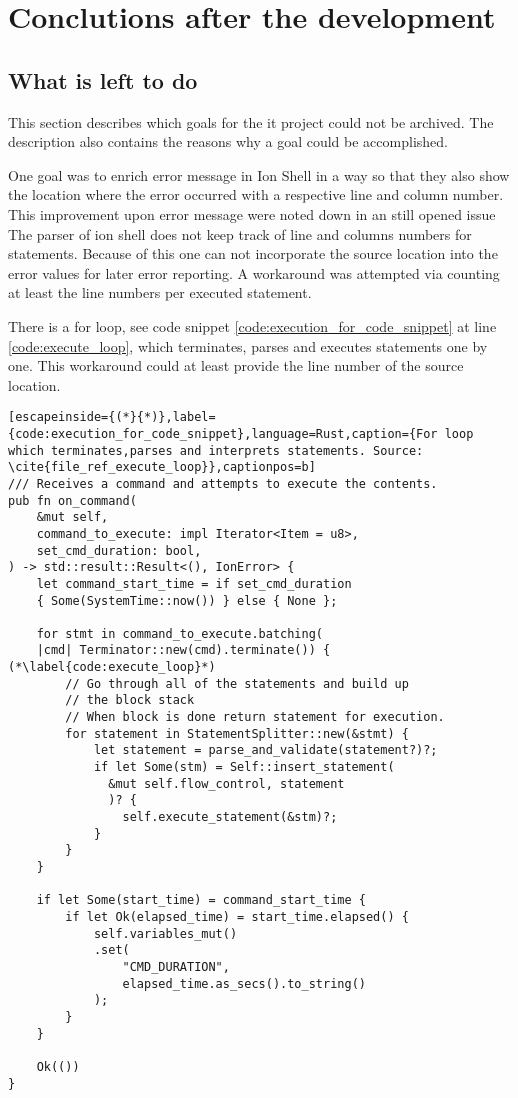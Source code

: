 \chapter{Conclutions after the development}

\section{What is left to do}

This section describes which goals for the it project could not be archived.
The description also contains the reasons why a goal could be accomplished.

One goal was to enrich error message in Ion Shell in a way
so that they also show the location where the error occurred with a respective line and column number.
This improvement upon error message were noted down in an still opened issue \cite{issue_enrich_error_message_information}
The parser of ion shell does not keep track of line and columns numbers for statements.
Because of this one can not incorporate the source location into the error values for later error reporting.
A workaround was attempted via counting at least the line numbers per executed statement.

There is a for loop, see code snippet \ref{code:execution_for_code_snippet} at line \ref{code:execute_loop},
which terminates, parses and executes statements one by one.
This workaround could at least provide the line number of the source location.



\clearpage
\begin{lstlisting}[escapeinside={(*}{*)},label={code:execution_for_code_snippet},language=Rust,caption={For loop which terminates,parses and interprets statements. Source: \cite{file_ref_execute_loop}},captionpos=b]
/// Receives a command and attempts to execute the contents.
pub fn on_command(
    &mut self,
    command_to_execute: impl Iterator<Item = u8>,
    set_cmd_duration: bool,
) -> std::result::Result<(), IonError> {
    let command_start_time = if set_cmd_duration 
    { Some(SystemTime::now()) } else { None };

    for stmt in command_to_execute.batching(
    |cmd| Terminator::new(cmd).terminate()) { (*\label{code:execute_loop}*) 
        // Go through all of the statements and build up 
        // the block stack
        // When block is done return statement for execution.
        for statement in StatementSplitter::new(&stmt) { 
            let statement = parse_and_validate(statement?)?;
            if let Some(stm) = Self::insert_statement(
              &mut self.flow_control, statement
              )? {
                self.execute_statement(&stm)?; 
            }
        }
    }

    if let Some(start_time) = command_start_time {
        if let Ok(elapsed_time) = start_time.elapsed() {
            self.variables_mut()
            .set(
                "CMD_DURATION", 
                elapsed_time.as_secs().to_string()
            );
        }
    }

    Ok(())
}
\end{lstlisting}



